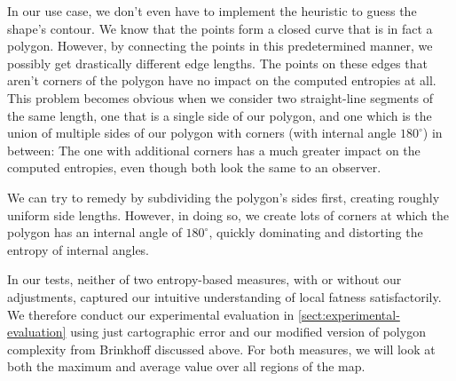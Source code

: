 In our use case, we don't even have to implement the heuristic to guess the shape's contour.
We know that the points form a closed curve that is in fact a polygon.
However, by connecting the points in this predetermined manner, we possibly get drastically different edge lengths.
The points on these edges that aren't corners of the polygon have no impact on the computed entropies at all.
This problem becomes obvious when we consider two straight-line segments of the same length, one that is a single side of our polygon, and one which is the union of multiple sides of our polygon with corners (with internal angle $180^\circ$) in between:
The one with additional corners has a much greater impact on the computed entropies, even though both look the same to an observer.

We can try to remedy by subdividing the polygon's sides first, creating roughly uniform side lengths.
However, in doing so, we create lots of corners at which the polygon has an internal angle of $180^\circ$, quickly dominating and distorting the entropy of internal angles.

In our tests, neither of two entropy-based measures, with or without our adjustments, captured our intuitive understanding of local fatness satisfactorily.
We therefore conduct our experimental evaluation in \cref{sect:experimental-evaluation} using just cartographic error and our modified version of polygon complexity from Brinkhoff \etal{} \cite{brinkhoff1995measuring} discussed above.
For both measures, we will look at both the maximum and average value over all regions of the map.
